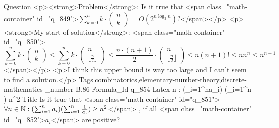Question <p><strong>Problem</strong>: Is it true that <span class="math-container" id="q_849">$\sum_{k=0}^{n}k\cdot \left(\begin{array}{l}{n}\\{k}\end{array}\right)=O\left( 2 ^ {n\log _{3}n}\right)?$</span></p>  <p><strong>My start of solution</strong>: <span class="math-container" id="q_850">$$\sum_{k=0}^{n}k\cdot \left(\begin{array}{l}{n}\\{k}\end{array}\right)\leq \sum_{k=0}^{n}k\cdot \left(\begin{array}{l}{n}\\{\lfloor \frac{n}{2}\rfloor}\end{array}\right)\leq \frac{n\cdot(n+1)}{2}\cdot \left(\begin{array}{l}{n}\\{\lfloor \frac{n}{2}\rfloor}\end{array}\right)\leq n(n+1)! \leq nn^n \leq n^{n+1}$$</span></p>  <p>I think this upper bound is way too large and I can't seem to find a solution.</p>
Tags combinatorics,elementary-number-theory,discrete-mathematics
_number B.86
Formula_Id q_854
Latex \forall n \in {} : \big(\sum_{i=1}^{n}a_{i}\big) \big(\sum_{i=1}^{n} \big) \ge n^2
Title Is it true that <span class="math-container" id="q_851">$\forall n \in \Bbb{N} : (\sum_{i=1}^{n} a_{i} ) (\sum_{i=1}^{n} \frac{1}{a_{i}} ) \ge n^2$</span> , if all <span class="math-container" id="q_852">$a_{i}$</span> are positive?
